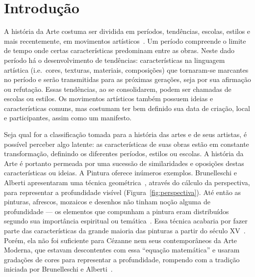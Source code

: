 



\chapter{Introdução}
\label{cap:intro} 

A história da Arte costuma ser dividida em períodos, tendências,
escolas, estilos e mais recentemente, em movimentos
artísticos~\cite{dempsey}. Um período compreende o limite de tempo
onde certas características predominam entre as obras. Neste dado
período há o desenvolvimento de tendências: características na
linguagem artística (i.e.\ cores, texturas, materiais, composições)
que tornaram-se marcantes no período e serão transmitidas para as
próximas gerações, seja por sua afirmação ou refutação. Essas
tendências, ao se consolidarem, podem ser chamadas de escolas ou
estilos. Os movimentos artísticos também possuem ideias e
características comuns, mas costumam ter bem definido sua data de
criação, local e participantes, assim como um manifesto.

Seja qual for a classificação tomada para a história das artes e de
seus artistas, é possível perceber algo latente: as características de
suas obras estão em constante transformação, definindo os diferentes
períodos, estilos ou escolas. A história da Arte é portanto permeada
por uma sucessão de similaridades e oposições destas características
ou ideias. A Pintura oferece inúmeros exemplos. Brunelleschi e Alberti
apresentaram uma técnica geométrica~\cite{andersen,kemp}, através do
cálculo da perspectiva, para representar a profundidade visível
(Figura~\ref{fig:perspectiva}). Até então as pinturas, afrescos,
mozaicos e desenhos não tinham noção alguma de profundidade --- os
elementos que compunham a pintura eram distribuídos segundo sua
importância espiritual ou temática~\cite{edgerton}. Essa técnica
acabaria por fazer parte das características da grande maioria das
pinturas a partir do século XV~\cite{gombrich}. Porém, ela não foi
suficiente para Cézanne nem seus contemporâneos da Arte Moderna, que
estavam descontentes com essa ``equação matemática'' e usaram
gradações de cores para representar a profundidade, rompendo com a
tradição iniciada por Brunelleschi e Alberti~\cite{sedlmayr}.

